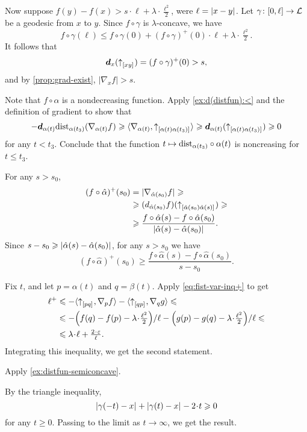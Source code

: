 Now suppose $f(y)-f(x)>s\cdot \ell+\lambda\cdot \tfrac{\ell^2}2$,
were $\ell=\dist{x}{y}{}$.
Let $\gamma\colon[0,\ell]\to \mathcal{L}$ be a geodesic from $x$ to $y$.
Since $f\circ\gamma$ is $\lambda$-concave, we have
\[f\circ\gamma(\ell)\le f\circ\gamma(0)+(f\circ\gamma)^+(0)\cdot\ell+\lambda\cdot \tfrac{\ell^2}2.\]
It follows that 
\[\bm{d}_x({\uparrow}_{[{x}{y}]_{{}}})=(f\circ\gamma)^+(0)>s,\]
and by \ref{prop:grad-exist}, $|\nabla_x f|>s$.

Note that $f\circ\alpha$ is a nondecreasing function.
Apply \ref{ex:d(distfun):<} and the definition of gradient to show that
\[
-\bm{d}_{\alpha(t)}\mathrm{dist}_{\alpha(t_3)}(\nabla_{\alpha(t)}f)
\geqslant
\langle \nabla_{\alpha(t)},{\uparrow}_{[{\alpha(t)}{\alpha(t_3)}]_{{}}}\rangle
\geqslant
\bm{d}_{\alpha(t)}({\uparrow}_{[{\alpha(t)}{\alpha(t_3)}]_{{}}})
\geqslant0
\]
for any $t<t_3$.
Conclude that the function 
$t\mapsto \mathrm{dist}_{\alpha(t_3)}\circ\alpha(t)$ is noncreasing for $t\le t_3$.

For any $s>s_0$,
\begin{align*}
(f\circ\hat\alpha)^+(s_0)&=|\nabla_{\hat\alpha(s_0)}f|
\ge
\\
&\ge
(d_{\hat\alpha(s_0)}f)(\dir{\hat\alpha(s_0)}{\hat\alpha(s)})
\ge
\\
&\ge
\frac{f\circ\hat\alpha(s)-f\circ\hat\alpha(s_0)}{\dist{\hat\alpha(s)}{\hat\alpha(s_0)}{}}.
\end{align*} 
Since $s-s_0\ge\dist{\hat\alpha(s)}{\hat\alpha(s_0)}{}$, for any $s>s_0$ we have 
\[(f\circ\hat\alpha)^+(s_0)\ge
\frac{f\circ\hat\alpha(s)-f\circ\hat\alpha(s_0)}{s-s_0}.\]

Fix $t$, and let $p=\alpha(t)$ and $q=\beta(t)$.
Apply \ref{eq:fist-var-inq+} to get
\begin{align*}
 \ell^+
&\le -\<\dir{p}{q},\nabla_{p}f\>
-\<\dir{q}{p},\nabla_{q}g\>
\le
\\
&\le -{\left({f(q)}-{f(p)}-\lambda\cdot\tfrac{\ell^2}2\right)}/{\ell}
-{\left({g(p)}-{g(q)}-\lambda\cdot\tfrac{\ell^2}2\right)}/{\ell}\le
\\
&\le \lambda\cdot\ell+\tfrac{2\cdot\eps}{\ell}.
\end{align*}
Integrating this inequality, we get the second statement.

 Apply \ref{ex:distfun-semiconcave}.

 By the triangle inequality, 
\[\dist{\gamma(-t)}{x}{}+\dist{\gamma(t)}{x}{}-2\cdot t\ge 0\]
for any $t\ge 0$.
Passing to the limit as $t\to\infty$, we get the result.

